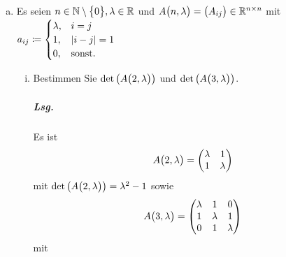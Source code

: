 \documentclass{scrreprt}
\begin{document}
\begin{enumerate}[(a)]
\newpage
\item Es seien $n \in \mathbb{N} \setminus \qty\big{0}, \lambda \in \mathbb{R}$
  und $A\qty\big(n, \lambda) = \qty\big(A_{ij}) \in \mathbb{R}^{n \times n}$ mit
  $a_{ij} \coloneqq \begin{cases}
    \lambda, & i = j \\
    1,       & \abs{i - j} = 1 \\
    0,       & \text{sonst.}
  \end{cases}$
  \begin{enumerate}[(i)]
  \item Bestimmen Sie $\det\qty(A\qty\big(2, \lambda))$ und
    $\det\qty(A\qty\big(3, \lambda))$.

    \subparagraph{Lsg.} Es ist
    \[
      A\qty\big(2, \lambda) = \begin{pmatrix}
        \lambda & 1       \\
        1       & \lambda \\
      \end{pmatrix}
    \]
    mit $\det\qty(A\qty\big(2, \lambda)) = \lambda^2 - 1$ sowie
    \[
      A\qty\big(3, \lambda) = \begin{pmatrix}
        \lambda & 1       & 0       \\
        1       & \lambda & 1       \\
        0       & 1       & \lambda \\
      \end{pmatrix}
    \]
    mit


\end{enumerate}
\end{enumerate}
\end{document}
